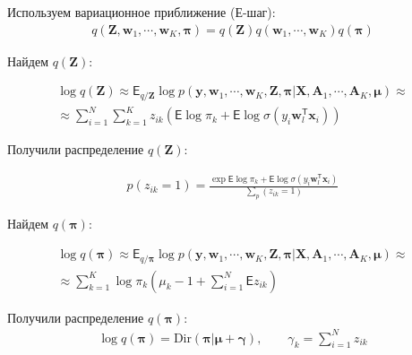 \documentclass[12pt, twoside]{article}
\numberwithin{equation}{section}
\begin{document}
Используем вариационное приближение (Е-шаг):
\begin{equation}
\label{eq:st:5}
\begin{aligned}
q\left(\textbf{Z}, \textbf{w}_1, \cdots, \textbf{w}_K, \bm{\pi}\right) = q\left(\textbf{Z}\right)q\left(\textbf{w}_1, \cdots,\textbf{w}_K\right)q\left(\bm{\pi}\right)
\end{aligned}
\end{equation}

Найдем $q\left(\textbf{Z}\right)$:

\begin{equation}
\label{eq:st:6}
\begin{aligned}
\log q\left(\textbf{Z}\right) \approx \mathsf{E}_{q/\textbf{Z}}\log{p\left(\textbf{y}, \textbf{w}_1, \cdots, \textbf{w}_K, \textbf{Z}, \bm{\pi}|\textbf{X}, \textbf{A}_1, \cdots, \textbf{A}_K, \bm{\mu}\right)}\approx \\
\approx \sum_{i=1}^{N}\sum_{k=1}^{K}z_{ik}\left(\mathsf{E}\log \pi_k + \mathsf{E}\log\sigma\left(y_i\textbf{w}_{l}^{\mathsf{T}}\textbf{x}_{i}\right)\right)
\end{aligned}
\end{equation}

Получили распределение $q\left(\textbf{Z}\right)$:

\begin{equation}
\label{eq:st:7}
\begin{aligned}
p\left(z_{ik} = 1\right) = \frac{\exp{\mathsf{E}\log{\pi_{k}}+\mathsf{E}\log{\sigma\left(y_i\textbf{w}_{l}^{\mathsf{T}}\textbf{x}_{i}\right)}}}{\sum_ p\left(z_{ik} = 1\right)}
\end{aligned}
\end{equation}

Найдем $q\left(\bm{\pi}\right)$:

\begin{equation}
\label{eq:st:8}
\begin{aligned}
\log q\left(\bm{\pi}\right) \approx \mathsf{E}_{q/\bm{\pi}}\log{p\left(\textbf{y}, \textbf{w}_1, \cdots, \textbf{w}_K, \textbf{Z}, \bm{\pi}|\textbf{X}, \textbf{A}_1, \cdots, \textbf{A}_K, \bm{\mu}\right)} \approx \\
\approx \sum_{k=1}^{K}\log{\pi_k}\left(\mu_k-1+\sum_{i=1}^{N}\mathsf{E}z_{ik}\right)
\end{aligned}
\end{equation}

Получили распределение $q\left(\bm{\pi}\right)$:
\begin{equation}
\label{eq:st:9}
\begin{aligned}
\log q\left(\bm{\pi}\right) = \text{Dir}\left(\bm{\pi}|\bm{\mu} + \bm{\gamma}\right), \qquad \gamma_k = \sum_{i=1}^{N}z_{ik}
\end{aligned}
\end{equation}
\end{document}
